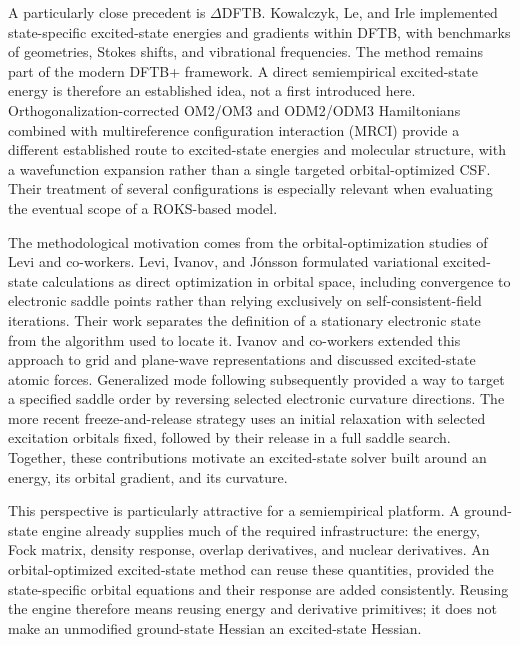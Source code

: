 \documentclass[11pt,a4paper]{article}
\begin{document}
A particularly close precedent is $\Delta$DFTB. Kowalczyk, Le, and Irle implemented state-specific excited-state energies and gradients within DFTB, with benchmarks of geometries, Stokes shifts, and vibrational frequencies.\cite{deltadftb2016} The method remains part of the modern DFTB+ framework.\cite{dftb2025} A direct semiempirical excited-state energy is therefore an established idea, not a first introduced here. Orthogonalization-corrected OM2/OM3 and ODM2/ODM3 Hamiltonians combined with multireference configuration interaction (MRCI) provide a different established route to excited-state energies and molecular structure, with a wavefunction expansion rather than a single targeted orbital-optimized CSF.\cite{omxexc2016,odmx2019} Their treatment of several configurations is especially relevant when evaluating the eventual scope of a ROKS-based model.

The methodological motivation comes from the orbital-optimization studies of Levi and co-workers. Levi, Ivanov, and J\'onsson formulated variational excited-state calculations as direct optimization in orbital space, including convergence to electronic saddle points rather than relying exclusively on self-consistent-field iterations.\cite{levifaraday,levi2020} Their work separates the definition of a stationary electronic state from the algorithm used to locate it. Ivanov and co-workers extended this approach to grid and plane-wave representations and discussed excited-state atomic forces.\cite{ivanov2021} Generalized mode following subsequently provided a way to target a specified saddle order by reversing selected electronic curvature directions.\cite{gmf2023} The more recent freeze-and-release strategy uses an initial relaxation with selected excitation orbitals fixed, followed by their release in a full saddle search.\cite{freeze2026} Together, these contributions motivate an excited-state solver built around an energy, its orbital gradient, and its curvature.

This perspective is particularly attractive for a semiempirical platform. A ground-state engine already supplies much of the required infrastructure: the energy, Fock matrix, density response, overlap derivatives, and nuclear derivatives. An orbital-optimized excited-state method can reuse these quantities, provided the state-specific orbital equations and their response are added consistently. Reusing the engine therefore means reusing energy and derivative primitives; it does not make an unmodified ground-state Hessian an excited-state Hessian.
\end{document}
